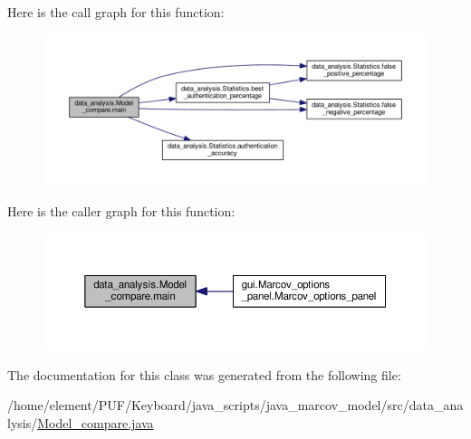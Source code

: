 Here is the call graph for this function\+:\nopagebreak
\begin{figure}[H]
\begin{center}
\leavevmode
\includegraphics[width=350pt]{classdata__analysis_1_1_model__compare_a439121c41a799d062e452218d88a59a9_cgraph}
\end{center}
\end{figure}




Here is the caller graph for this function\+:\nopagebreak
\begin{figure}[H]
\begin{center}
\leavevmode
\includegraphics[width=350pt]{classdata__analysis_1_1_model__compare_a439121c41a799d062e452218d88a59a9_icgraph}
\end{center}
\end{figure}




The documentation for this class was generated from the following file\+:\begin{DoxyCompactItemize}
\item 
/home/element/\+P\+U\+F/\+Keyboard/java\+\_\+scripts/java\+\_\+marcov\+\_\+model/src/data\+\_\+analysis/\hyperlink{_model__compare_8java}{Model\+\_\+compare.\+java}\end{DoxyCompactItemize}
